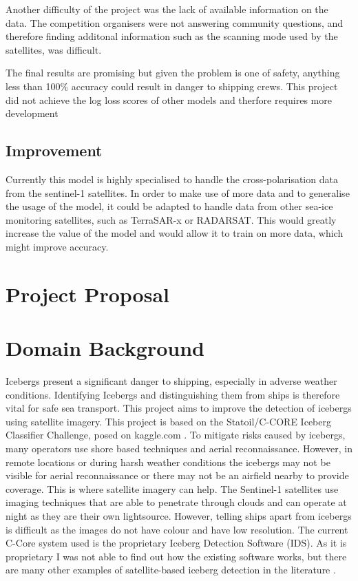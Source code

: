 \documentclass{article}
\begin{document}
Another difficulty of the project was the lack of available information on the data. The competition organisers were not answering community questions, and therefore finding additonal information such as the scanning mode used by the satellites, was difficult. 

The final results are promising but given the problem is one of safety, anything less than 100\% accuracy could result in danger to shipping crews. This project did not achieve the log loss scores of other models and therfore requires more development 
\subsection{Improvement}
Currently this model is highly specialised to handle the cross-polarisation data from the sentinel-1 satellites. In order to make use of more data and to generalise the usage of the model, it could be adapted to handle data from other sea-ice monitoring satellites, such as TerraSAR-x or RADARSAT. This would greatly increase the value of the model and would allow it to train on more data, which might improve accuracy. 


\newpage{}
\section{Project Proposal}
\section{Domain Background}
Icebergs present a significant danger to shipping, especially in adverse weather conditions. Identifying Icebergs and distinguishing them from ships is therefore vital for safe sea transport. This project aims to improve the detection of icebergs using satellite imagery. This project is based on the Statoil/C-CORE Iceberg Classifier Challenge, posed on kaggle.com \cite{kaggle}. To mitigate risks caused by icebergs, many operators use shore based techniques and aerial reconnaissance. However, in remote locations or during harsh weather conditions the icebergs may not be visible for aerial reconnaissance or there may not be an airfield nearby to provide coverage. This is where satellite imagery can help. The Sentinel-1 satellites use imaging techniques that are able to penetrate through clouds and can operate at night as they are their own lightsource. However, telling ships apart from icebergs is difficult as the images do not have colour and have low resolution. The current C-Core system used is the proprietary Iceberg Detection Software (IDS). As it is proprietary I was not able to find out how the existing software works, but there are many other examples of satellite-based iceberg detection in the literature  \cite{c-core,bentes}. 
\end{document}
